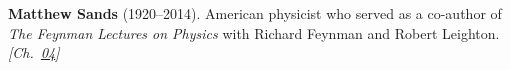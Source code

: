 \textbf{Matthew Sands} (1920–2014). American physicist who served as a co-author of \emph{The Feynman Lectures on Physics} with Richard Feynman and Robert Leighton. \emph{[Ch.~\hyperref[ch:energytransmission]{04}]}

